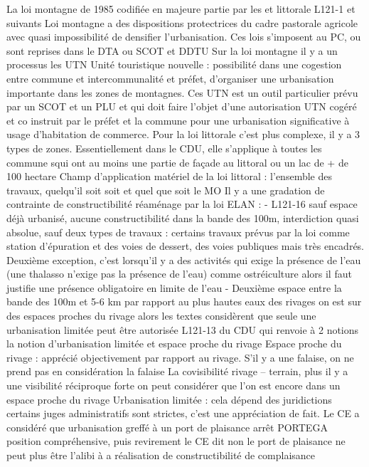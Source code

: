 	La loi montagne de 1985 codifiée en majeure partie par les  et littorale L121-1 et suivants
	Loi montagne a des dispositions protectrices du cadre pastorale agricole avec quasi impossibilité de densifier l’urbanisation.
	Ces lois s’imposent au PC, ou sont reprises dans le DTA ou SCOT et DDTU
	Sur la loi montagne il y a un processus les UTN Unité touristique nouvelle : possibilité dans une cogestion entre commune et intercommunalité et préfet, d’organiser une urbanisation importante dans les zones de montagnes.
	Ces UTN est un outil particulier prévu par un SCOT et un PLU et qui doit faire l’objet d’une autorisation UTN cogéré et co instruit par le préfet et la commune pour une urbanisation significative à usage d’habitation de commerce.
	Pour la loi littorale c’est plus complexe, il y a 3 types de zones. Essentiellement dans le CDU, elle s’applique à toutes les commune squi ont au moins une partie de façade au littoral ou un lac de + de 100 hectare
	Champ d’application matériel de la loi littoral : l’ensemble des travaux, quelqu’il soit soit et quel que soit le MO
	Il y a une gradation de contrainte de constructibilité réaménage par la loi ELAN :
	-	L121-16 sauf espace déjà urbanisé, aucune constructibilité dans la bande des 100m, interdiction quasi absolue, sauf deux types de travaux : certains travaux prévus par la loi comme station d’épuration et des voies de dessert, des voies publiques mais très encadrés. Deuxième exception, c’est lorsqu’il y a des activités qui exige la présence de l’eau (une thalasso n’exige pas la présence de l’eau) comme ostréiculture alors il faut justifie une présence obligatoire en limite de l’eau
	-	Deuxième espace entre la bande des 100m et 5-6 km par rapport au plus hautes eaux des rivages on est sur des espaces proches du rivage alors les textes considèrent que seule une urbanisation limitée peut être autorisée L121-13 du CDU qui renvoie à 2 notions la notion d’urbanisation limitée et espace proche du rivage
	Espace proche du rivage : apprécié objectivement par rapport au rivage. S’il y a une falaise, on ne prend pas en considération la falaise
	La covisibilité rivage – terrain, plus il y a une visibilité réciproque forte on peut considérer que l’on est encore dans un espace proche du rivage
	Urbanisation limitée : cela dépend des juridictions certains juges administratifs sont strictes, c’est une appréciation de fait. Le CE a considéré que urbanisation greffé à un port de plaisance arrêt PORTEGA position compréhensive, puis revirement le CE dit non le port de plaisance ne peut plus être l’alibi à a réalisation de constructibilité de complaisance
